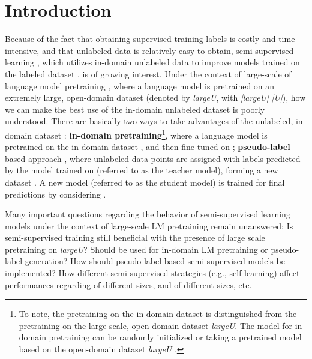 \documentclass[11pt,a4paper]{article}
\begin{document}
\section{Introduction} 
Because of the fact that
obtaining 
 supervised training labels is costly and time-intensive, 
 and that   unlabeled data is relatively easy to obtain, 
 semi-supervised learning  \cite{10.7551/mitpress/9780262033589.001.0001,zhu2005semi}, which 
utilizes 
in-domain
 unlabeled data  to improve models trained on the labeled dataset , is of growing interest. 
Under the context of large-scale of language model pretraining \citep{devlin2018bert,yang2019xlnet,yinhan2019roberta,lewis2019bart,bao2020unilmv2,danqi2020spanbert},  where a language model is pretrained on an extremely large, open-domain dataset (denoted by {\it largeU}, with {\it |largeU|}  {\it |U|}),
  how we can make the best use of the in-domain unlabeled dataset 
   is poorly understood. 
 There are basically two ways to take advantages of  the unlabeled, in-domain dataset : 
 {\bf in-domain pretraining}\footnote{To note,  
 the pretraining on the in-domain dataset  is distinguished from the pretraining on the large-scale, open-domain dataset {\it largeU}.
 The model for in-domain pretraining can be randomly initialized or 
 taking a pretrained model based on the open-domain dataset {\it largeU} \citep{dontstoppretraining2020}.}, where a language model is pretrained on 
 the in-domain dataset
 , and then   fine-tuned on ; 
{\bf pseudo-label} based approach \citep{lee2013pseudo,reed2015training,iscen2019label,Shi_2018_ECCV,arazo2020pseudo}, where unlabeled data points are assigned with labels predicted by the model trained  on  (referred to as the teacher model), forming a new dataset . 
A new model (referred to as the student model) is trained for final predictions by considering . 

Many important questions regarding the behavior of semi-supervised learning models under the context of large-scale LM pretraining 
 remain unanswered:  
 Is semi-supervised training
 still beneficial with the presence of large scale pretraining on {\it largeU}? 
  Should  be used for in-domain LM pretraining or pseudo-label generation?
 How should  pseudo-label based semi-supervised models 
  be  implemented?
How different semi-supervised strategies (e.g., self learning) affect performances regarding  of different sizes, and  of different sizes, etc. 
\end{document}
